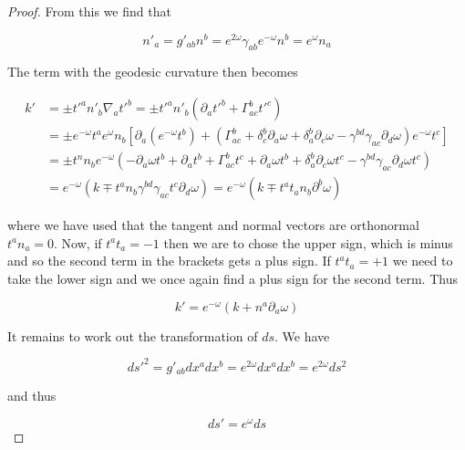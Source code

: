 \begin{tcolorbox}[breakable]
\begin{proof}
		From this we find that
		
		\begin{equation}
			n'_a = g'_{ab}n^b = e^{2\omega} \gamma_{ab} e^{-\omega} n^b = e^{\omega} n_a
		\end{equation}
		
		The term with the geodesic curvature then becomes
		
		\begin{equation}
			\begin{aligned}
				k' &= \pm t'^a n'_b \nabla_a t'^b = \pm t'^a n'_b (\partial_a t'^b + \Gamma^b_{ac} t'^c) \\
				&= \pm e^{-\omega} t^a e^{\omega} n_b \left[ \partial_a (e^{-\omega} t^b) + (\Gamma^b_{ac} + \delta^b_c \partial_a \omega + \delta^b_a \partial_c \omega - \gamma^{bd} \gamma_{ac} \partial_d \omega) e^{-\omega} t^c \right] \\
				&= \pm t^n n_b e^{-\omega} \left( -\partial_a \omega t^b + \partial_a t^b + \Gamma^b_{ac} t^c + \partial_a \omega t^b + \delta^b_a \partial_c \omega t^c - \gamma^{bd} \gamma_{ac} \partial_d \omega t^c \right) \\
				&= e^{-\omega} (k \mp t^a n_b \gamma^{bd} \gamma_{ac}  t^c\partial_d \omega) = e^{-\omega} (k \mp t^a t_a n_b \partial^b \omega)
			\end{aligned}
		\end{equation}
		
		where we have used that the tangent and normal vectors are orthonormal \( t^a n_a = 0 \). Now, if \( t^a t_a = -1 \) then we are to chose the upper sign, which is minus and so the second term in the brackets gets a plus sign. If \( t^a t_a = +1 \) we need to take the lower sign and we once again find a plus sign for the second term. Thus
		
		\begin{equation}
			k' = e^{-\omega} (k + n^a \partial_a \omega)
		\end{equation}
		
		It remains to work out the transformation of \( ds \). We have
		
		\begin{equation}
			ds'^2 = g'_{ab} dx^a dx^b = e^{2\omega} dx^a dx^b = e^{2\omega} ds^2
		\end{equation}
		
		and thus
		
		\begin{equation}
			ds' = e^{\omega} ds
		\end{equation}
		

\end{proof}
\end{tcolorbox}
